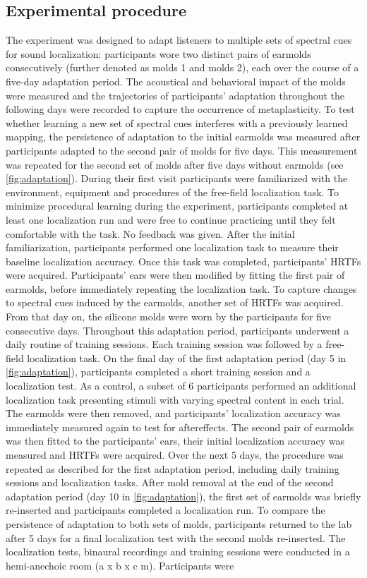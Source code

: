 \subsection{Experimental procedure}
The experiment was designed to adapt listeners to multiple sets of spectral cues for sound localization: participants wore two distinct pairs of earmolds consecutively (further denoted as molds 1 and molds 2), each over the course of a five-day adaptation period. The acoustical and behavioral impact of the molds were measured and the trajectories of participants’ adaptation throughout the following days were recorded to capture the occurrence of metaplasticity. To test whether learning a new set of spectral cues interferes with a previously learned mapping, the persistence of adaptation to the initial earmolds was measured after participants adapted to the second pair of molds for five days. This measurement was repeated for the second set of molds after five days without earmolds (see \cref{fig:adaptation}). During their first visit participants were familiarized with the environment, equipment and procedures of the free-field localization task. To minimize procedural learning during the experiment, participants completed at least one localization run and were free to continue practicing until they felt comfortable with the task. No feedback was given. After the initial familiarization, participants performed one localization task to measure their baseline localization accuracy. Once this task was completed, participants’ HRTFs were acquired. Participants’ ears were then modified by fitting the first pair of earmolds, before immediately repeating the localization task. To capture changes to spectral cues induced by the earmolds, another set of HRTFs was acquired. From that day on, the silicone molds were worn by the participants for five consecutive days. Throughout this adaptation period, participants underwent a daily routine of training sessions. Each training session was followed by a free-field localization task. On the final day of the first adaptation period (day 5 in \cref{fig:adaptation}), participants completed a short training session and a localization test. As a control, a subset of 6 participants performed an additional localization task presenting stimuli with varying spectral content in each trial. The earmolds were then removed, and participants’ localization accuracy was immediately measured again to test for aftereffects. The second pair of earmolds was then fitted to the participants’ ears, their initial localization accuracy was measured and HRTFs were acquired. Over the next 5 days, the procedure was repeated as described for the first adaptation period, including daily training sessions and localization tasks. After mold removal at the end of the second adaptation period (day 10 in \cref{fig:adaptation}), the first set of earmolds was briefly re-inserted and participants completed a localization run. To compare the persistence of adaptation to both sets of molds, participants returned to the lab after 5 days for a final localization test with the second molds re-inserted. The localization tests, binaural recordings and training sessions were conducted in a hemi-anechoic room (a x b x c m). Participants were 